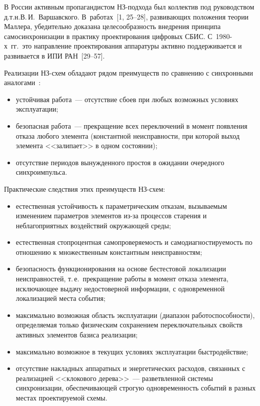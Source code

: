 \begin{multicols}{2}
       В России активным пропагандистом НЗ-под\-хода был коллектив под руководством 
д.т.н.\linebreak В.\,И.~Варшавского. В~работах~[1, 25--28], 
развивающих положения теории Маллера, убедительно доказана целесообразность 
внедрения принципа самосинхронизации в практику проектирования цифровых СБИС. 
С~1980-х~гг.\ это направление проектирования аппаратуры активно поддерживается и 
развивается в ИПИ РАН~[29--57]. 
       
       Реализации НЗ-схем обладают рядом преимуществ по сравнению с синхронными 
аналогами~\cite{29-sok}:
       \begin{itemize}
\item устойчивая работа~--- отсутствие сбоев при любых возможных условиях эксплуатации;
\item безопасная работа~--- прекращение всех переключений в момент появления отказа 
любого элемента (константной неисправности, при которой выход элемента <<залипает>> в 
одном состоянии);
\item отсутствие периодов вынужденного простоя в ожидании очередного синхроимпульса.
       \end{itemize}
       
       Практические следствия этих преимуществ НЗ-схем:
       \begin{itemize}
\item естественная устойчивость к параметрическим отказам, вызываемым изменением 
параметров элементов из-за процессов старения и неблагоприятных воздействий 
окружающей среды;
\item естественная стопроцентная самопрове\-ря\-емость и самодиагностируемость по 
отношению к множественным константным неисправностям;
\item безопасность функционирования на основе бестес\-товой локализации неисправностей, 
т.\,е.\ прекращение работы в момент отказа элемента, исключающее выдачу недостоверной 
информации, с одновременной локализацией места события;
\item максимально возможная область эксплуатации (диапазон работоспособности), 
определяемая только физическим сохранением переключательных свойств активных 
элементов базиса реализации;
\item максимально возможное в текущих условиях эксплуатации быстродействие;
\item отсутствие накладных аппаратных и энергетических расходов, связанных с 
реализацией <<клокового дерева>>~--- разветвленной системы синхронизации, 
обеспечивающей строгую одновременность событий в разных местах проектируемой схемы.
       \end{itemize}
       

\end{multicols}
